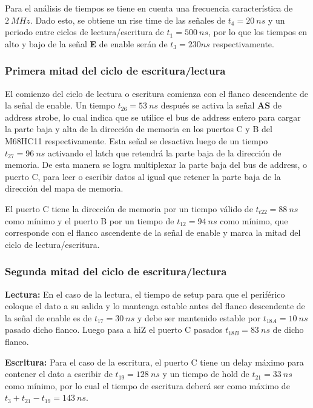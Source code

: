 Para el análisis de tiempos se tiene en cuenta una frecuencia característica de $2 \ MHz$. Dado esto, se obtiene un rise time de las señales de $t_4 = 20 \ ns$ y un periodo entre ciclos de lectura/escritura de $t_1 = 500 \ ns$, por lo que los tiempos en alto y bajo de la señal \textbf{E} de enable serán de $t_3 = 230 ns$ respectivamente. 

\subsubsection{Primera mitad del ciclo de escritura/lectura}

El comienzo del ciclo de lectura o escritura comienza con el flanco descendente de la señal de enable. Un tiempo $t_{26} = 53 \ ns$ después se activa la señal \textbf{AS} de address strobe, lo cual indica que se utilice el bus de address entero para cargar la parte baja y alta de la dirección de memoria en los puertos C y B del M68HC11 respectivamente. Esta señal se desactiva luego de un tiempo $t_{27} = 96 \ ns$ activando el latch que retendrá la parte baja de la dirección de memoria. De esta manera se logra multiplexar la parte baja del bus de address, o puerto C, para leer o escribir datos al igual que retener la parte baja de la dirección del mapa de memoria.

El puerto C tiene la dirección de memoria por un tiempo válido de $t_{t22} = 88 \ ns$ como mínimo y el puerto B por un tiempo de $t_{12} = 94 \ ns$ como mínimo, que corresponde con el flanco ascendente de la señal de enable y marca la mitad del ciclo de lectura/escritura.

\subsubsection{Segunda mitad del ciclo de escritura/lectura} 
\textbf{Lectura:}
En el caso de la lectura, el tiempo de setup para que el periférico coloque el dato a su salida y lo mantenga estable antes del flanco descendente de la señal de enable es de $t_{17} = 30 \ ns$ y debe ser mantenido estable por $t_{18A} = 10 \ ns$ pasado dicho flanco. Luego pasa a hiZ el puerto C pasados $t_{18B} = 83 \ ns$ de dicho flanco.

\textbf{Escritura:}
Para el caso de la escritura, el puerto C tiene un delay máximo para contener el dato a escribir de $t_{19} = 128 \ ns$ y un tiempo de hold de $t_{21} = 33 \ ns$ como mínimo, por lo cual el tiempo de escritura deberá ser como máximo de $t_{3} + t_{21} - t_{19} = 143 \ ns$.

